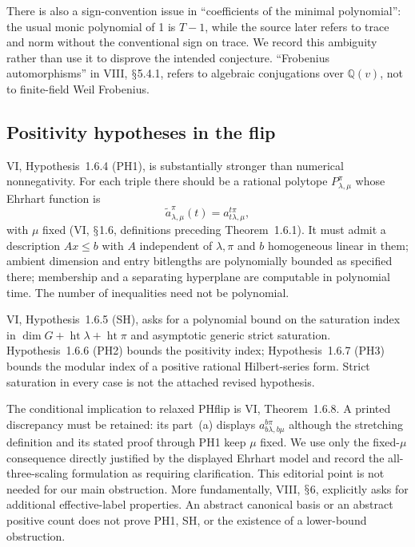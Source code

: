 \documentclass[11pt,a4paper]{article}
\newcommand{\Q}{\mathbb Q}\newcommand{\Z}{\mathbb Z}\newcommand{\C}{\mathbb C}\newcommand{\N}{\mathbb N}\newcommand{\F}{\mathbb F}
\renewcommand{\S}{\ensuremath{\mathsection}}
\theoremstyle{named}\newtheorem{finding}{Finding}[section]
\theoremstyle{definition}\newtheorem{definition}[finding]{Definition}
\theoremstyle{remark}\newtheorem{remark}[finding]{Remark}
\begin{document}
There is also a sign-convention issue in ``coefficients of the minimal polynomial'': the usual monic polynomial of 1 is $T-1$, while the source later refers to trace and norm without the conventional sign on trace. We record this ambiguity rather than use it to disprove the intended conjecture. ``Frobenius automorphisms'' in VIII, \S5.4.1, refers to algebraic conjugations over $\Q(v)$, not to finite-field Weil Frobenius.

\subsection{Positivity hypotheses in the flip}
VI, Hypothesis~1.6.4 (PH1), is substantially stronger than numerical nonnegativity. For each triple there should be a rational polytope $P_{\lambda,\mu}^{\pi}$ whose Ehrhart function is
\[
 \widetilde a_{\lambda,\mu}^{\pi}(t)=a_{t\lambda,\mu}^{t\pi},
\]
with $\mu$ fixed (VI, \S1.6, definitions preceding Theorem~1.6.1). It must admit a description $Ax\le b$ with $A$ independent of $\lambda,\pi$ and $b$ homogeneous linear in them; ambient dimension and entry bitlengths are polynomially bounded as specified there; membership and a separating hyperplane are computable in polynomial time. The number of inequalities need not be polynomial.

VI, Hypothesis~1.6.5 (SH), asks for a polynomial bound on the saturation index in $\dim G+\operatorname{ht}\lambda+\operatorname{ht}\pi$ and asymptotic generic strict saturation. Hypothesis~1.6.6 (PH2) bounds the positivity index; Hypothesis~1.6.7 (PH3) bounds the modular index of a positive rational Hilbert-series form. Strict saturation in every case is not the attached revised hypothesis.

The conditional implication to relaxed PHflip is VI, Theorem~1.6.8. A printed discrepancy must be retained: its part~(a) displays $a_{b\lambda,b\mu}^{b\pi}$ although the stretching definition and its stated proof through PH1 keep $\mu$ fixed. We use only the fixed-$\mu$ consequence directly justified by the displayed Ehrhart model and record the all-three-scaling formulation as requiring clarification. This editorial point is not needed for our main obstruction. More fundamentally, VIII, \S6, explicitly asks for additional effective-label properties. An abstract canonical basis or an abstract positive count does not prove PH1, SH, or the existence of a lower-bound obstruction.
\end{document}
